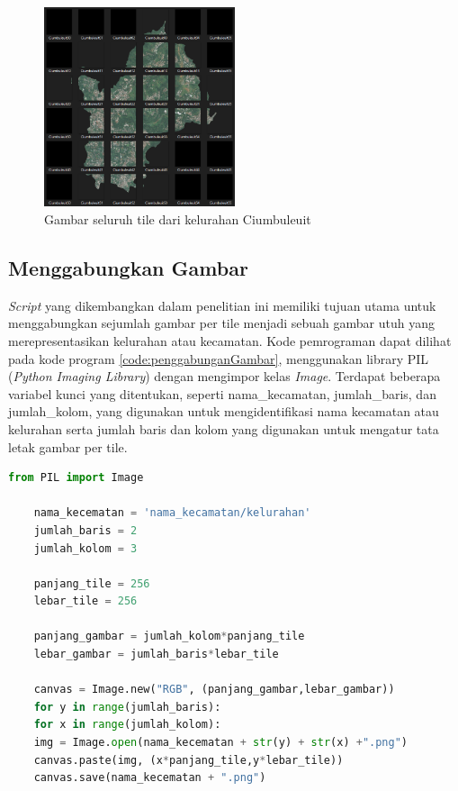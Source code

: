 \begin{figure}[H]
	\centering
	\includegraphics[width=0.5\textwidth]{Gambar/result gambar per tile.png}
	\caption{Gambar seluruh tile dari kelurahan Ciumbuleuit}
	\label{fig:pertileciumbuleuit}
\end{figure} 

\subsection{Menggabungkan Gambar}
\label{subsec:gabunggambar}
\textit{Script} yang dikembangkan dalam penelitian ini memiliki tujuan utama untuk menggabungkan sejumlah gambar per tile menjadi sebuah gambar utuh yang merepresentasikan kelurahan atau kecamatan. Kode pemrograman dapat dilihat pada kode program \ref{code:penggabunganGambar}, menggunakan library PIL (\textit{Python Imaging Library}) dengan mengimpor kelas \textit{Image}. Terdapat beberapa variabel kunci yang ditentukan, seperti nama\_kecamatan, jumlah\_baris, dan jumlah\_kolom, yang digunakan untuk mengidentifikasi nama kecamatan atau kelurahan serta jumlah baris dan kolom yang digunakan untuk mengatur tata letak gambar per tile.

\begin{lstlisting}[language=Python, caption=Script Penggabungan Gambar,label={code:penggabunganGambar}]
	from PIL import Image
	
	nama_kecematan = 'nama_kecamatan/kelurahan'
	jumlah_baris = 2
	jumlah_kolom = 3
	
	panjang_tile = 256
	lebar_tile = 256
	
	panjang_gambar = jumlah_kolom*panjang_tile
	lebar_gambar = jumlah_baris*lebar_tile
	
	canvas = Image.new("RGB", (panjang_gambar,lebar_gambar))
	for y in range(jumlah_baris):
	for x in range(jumlah_kolom):
	img = Image.open(nama_kecematan + str(y) + str(x) +".png")
	canvas.paste(img, (x*panjang_tile,y*lebar_tile))
	canvas.save(nama_kecematan + ".png")
	
\end{lstlisting}

